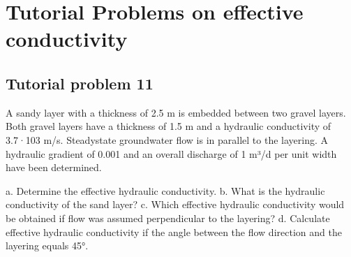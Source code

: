 \documentclass[letterpaper,10pt,english]{jupyterBook}
\begin{document}
\section{Tutorial Problems on effective conductivity}
\label{\detokenize{content/tutorials/T4/tutorial_04:tutorial-problems-on-effective-conductivity}}

\subsection{Tutorial problem 11}
\label{\detokenize{content/tutorials/T4/tutorial_04:tutorial-problem-11}}
\sphinxAtStartPar
A sandy layer with a thickness of 2.5 m is embedded between two gravel layers. Both gravel layers have a thickness of 1.5 m and a hydraulic conductivity of 3.7·10\sphinxhyphen{}3 m/s.
Steady\sphinxhyphen{}state groundwater flow is in parallel to the layering.
A hydraulic gradient of 0.001 and an overall discharge of 1 m³/d per unit width have been determined.

a. Determine the effective hydraulic conductivity.
b. What is the hydraulic conductivity of the sand layer?
c. Which effective hydraulic conductivity would be obtained if flow was assumed perpendicular to the layering?
d. Calculate effective hydraulic conductivity if the angle between the flow direction and the layering equals 45°.
\end{document}
